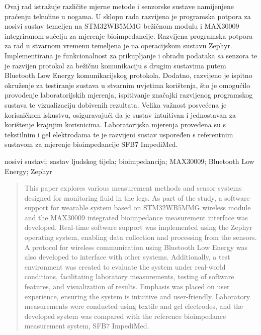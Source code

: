 \documentclass[diplomskirad, numeric, utf8, times]{fer}
\begin{document}

\begin{sazetak}

Ovaj rad istražuje različite mjerne metode i senzorske sustave namijenjene praćenju tekućine u nogama. 
U sklopu rada razvijena je programska potpora za nosivi sustav temeljen na STM32WB5MMG bežičnom modulu i 
MAX30009 integriranom sučelju za mjerenje bioimpedancije. 
Razvijena programska potpora za rad u stvarnom vremenu temeljena je na operacijskom sustavu Zephyr. 
Implementirana je funkcionalnost za prikupljanje i obradu podataka sa senzora te je razvijen 
protokol za bežičnu komunikaciju s drugim sustavima putem Bluetooth Low Energy komunikacijskog protokola.
Dodatno, razvijeno je ispitno okruženje za testiranje sustava u stvarnim uvjetima korištenja, 
što je omogućilo provođenje laboratorijskih mjerenja, ispitivanje značajki razvijenog programskog sustava 
te vizualizaciju dobivenih rezultata. 
Velika važnost posvećena je korisničkom iskustvu, osiguravajući da je sustav intuitivan i 
jednostavan za korištenje krajnjim korisnicima.
Laboratorijska mjerenja provedena su s tekstilnim i gel elektrodama te je razvijeni sustav uspoređen 
s referentnim sustavom za mjerenje bioimpedancije SFB7 ImpediMed.

\end{sazetak}

\begin{kljucnerijeci}
nosivi sustavi; sastav ljudskog tijela; bioimpedancija; MAX30009; Bluetooth Low Energy; Zephyr 
\end{kljucnerijeci}


\begin{abstract}
This paper explores various measurement methods and sensor systems designed for monitoring fluid 
in the legs. 
As part of the study, a software support for wearable system based on STM32WB5MMG wireless module and the MAX30009 integrated bioimpedance 
measurement interface was developed. 
Real-time software support was implemented using the Zephyr operating system, 
enabling data collection and processing from the sensors. 
A protocol for wireless communication using Bluetooth Low Energy 
was also developed to interface with other systems.
Additionally, a test environment was created to evaluate the system under real-world conditions, 
facilitating laboratory measurements, testing of software features, 
and visualization of results. Emphasis was placed on user experience, 
ensuring the system is intuitive and user-friendly. 
Laboratory measurements were conducted using textile and gel electrodes, 
and the developed system was compared with the reference bioimpedance measurement system, SFB7 ImpediMed.
\end{abstract}
\end{document}
